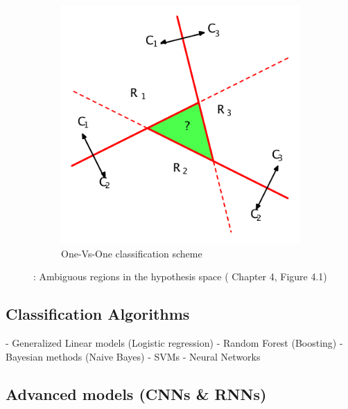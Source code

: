 \begin{figure}[h]
\begin{subfigure}[b]{0.4\textwidth}
        \includegraphics[width=\textwidth]{img/Bishop2006aa-p182-ch4-fig4-1-b.pdf}
        \caption{One-Vs-One classification scheme}
        \label{fig:Bishop2006aa-p182-ch4-fig4-1-b}
    \end{subfigure}
    \caption{: Ambiguous regions in the hypothesis space (\cite{Bishop:2006aa} Chapter 4, Figure 4.1) }
    \label{fig:Bishop2006aa-p182-ch4-fig4-1}
\end{figure}

\subsection{Classification Algorithms}

- Generalized Linear models (Logistic regression)
- Random Forest (Boosting)
- Bayesian methods (Naive Bayes)
- SVMs
- Neural Networks

\subsection{Advanced models (CNNs & RNNs)}
\label{sub:Advanced models (CNNs & RNNs)}

